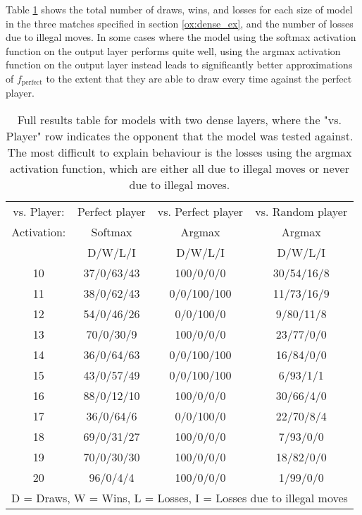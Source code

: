 \documentclass{somasmsc}
\begin{document}
\begin{exa}
Table \ref{ox:t1} shows the total number of draws, wins, and losses for each size of model in the three matches specified in section \ref{ox:dense_ex}, and the number of losses due to illegal moves. In some cases where the model using the softmax activation function on the output layer performs quite well, using the argmax activation function on the output layer instead leads to significantly better approximations of $f_{\text{perfect}}$ to the extent that they are able to draw every time against the perfect player.

\begin{table}[h!]
\centering
\begin{tabular}{ |c|c|c|c| }
 \hline
  vs. Player: & Perfect player & vs. Perfect player & vs. Random player \\
  Activation: & Softmax & Argmax & Argmax \\
  & D/W/L/I & D/W/L/I & D/W/L/I \\
 \hline
 10 & 37/0/63/43 & 100/0/0/0   & 30/54/16/8 \\
 11 & 38/0/62/43 & 0/0/100/100 & 11/73/16/9 \\
 12 & 54/0/46/26 & 0/0/100/0   & 9/80/11/8  \\
 13 & 70/0/30/9  & 100/0/0/0   & 23/77/0/0  \\
 14 & 36/0/64/63 & 0/0/100/100 & 16/84/0/0  \\
 15 & 43/0/57/49 & 0/0/100/100 & 6/93/1/1   \\
 16 & 88/0/12/10 & 100/0/0/0   & 30/66/4/0  \\
 17 & 36/0/64/6  & 0/0/100/0   & 22/70/8/4  \\
 18 & 69/0/31/27 & 100/0/0/0   & 7/93/0/0   \\
 19 & 70/0/30/30 & 100/0/0/0   & 18/82/0/0  \\
 20 & 96/0/4/4   & 100/0/0/0   & 1/99/0/0   \\
 \hline
 \multicolumn{4}{|c|}{D = Draws, W = Wins, L = Losses, I = Losses due to illegal moves} \\
 \hline
\end{tabular}
\caption{Full results table for models with two dense layers, where the "vs. Player" row indicates the opponent that the model was tested against. The most difficult to explain behaviour is the losses using the argmax activation function, which are either all due to illegal moves or never due to illegal moves.}
\label{ox:t1}
\end{table}


\end{exa}
\end{document}
